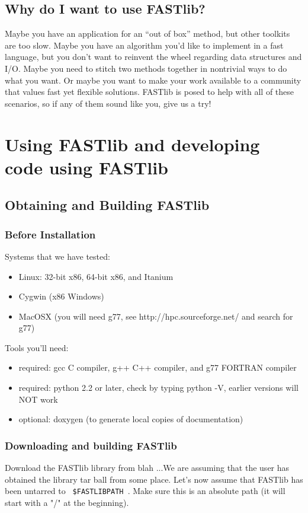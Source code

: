 \documentclass[letter]{report}
\begin{document}
\section{Why do I want to use FASTlib?} 
Maybe you have an application for an ``out of box'' method, but other
toolkits are too slow.  Maybe you have an algorithm you'd like to
implement in a fast language, but you don't want to reinvent the wheel
regarding data structures and I/O.  Maybe you need to stitch two
methods together in nontrivial ways to do what you want.  Or maybe you
want to make your work available to a community that values fast yet
flexible solutions.  FASTlib is posed to help with all of these
scenarios, so if any of them sound like you, give us a try!

\chapter {Using FASTlib and developing code using FASTlib}
\section{Obtaining and Building FASTlib}
\subsection {Before Installation}
Systems that we have tested:
\begin{itemize}
\item Linux: 32-bit x86, 64-bit x86, and Itanium
\item Cygwin (x86 Windows)
\item MacOSX (you will need g77, see http://hpc.sourceforge.net/ and search for g77)
\end {itemize} 
Tools you'll need:
\begin {itemize}
\item required: gcc C compiler, g++ C++ compiler, and g77 FORTRAN compiler
\item required: python 2.2 or later, check by typing python -V, earlier versions will NOT work
\item optional: doxygen (to generate local copies of documentation) 
\end {itemize}

\subsection{Downloading and building FASTlib}
Download the FASTlib library from blah ...We are assuming that the user has obtained the library tar ball from some place. Let's now assume that FASTlib has been untarred to \verb= $FASTLIBPATH =. Make sure this is an absolute path (it will start with a "/" at the beginning).
\end{document}
